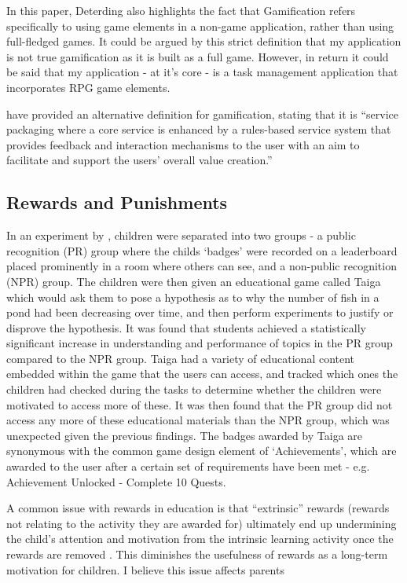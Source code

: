 In this paper, Deterding also highlights the fact that Gamification refers specifically to using game elements in a non-game application, rather than using full-fledged games.
It could be argued by this strict definition that my application is not true gamification as it is built as a full game.
However, in return it could be said that my application - at it's core - is a task management application that incorporates RPG game elements.

\cite{huotari2011gamification} have provided an alternative definition for gamification, stating that it is ``service packaging where a core service is enhanced by a rules-based service system that provides feedback and interaction mechanisms to the user with an aim to facilitate and support the users’ overall value creation.''

\subsection{Rewards and Punishments}
In an experiment by \cite{Filsecker2014136}, children were separated into two groups - a public recognition (PR) group where the childs `badges' were recorded on a leaderboard placed prominently in a room where others can see, and a non-public recognition (NPR) group.
The children were then given an educational game called Taiga which would ask them to pose a hypothesis as to why the number of fish in a pond had been decreasing over time, and then perform experiments to justify or disprove the hypothesis.
It was found that students achieved a statistically significant increase in understanding and performance of topics in the PR group compared to the NPR group.
Taiga had a variety of educational content embedded within the game that the users can access, and tracked which ones the children had checked during the tasks to determine whether the children were motivated to access more of these. 
It was then found that the PR group did not access any more of these educational materials than the NPR group, which was unexpected given the previous findings. 
The badges awarded by Taiga are synonymous with the common game design element of `Achievements', which are awarded to the user after a certain set of requirements have been met - e.g. Achievement Unlocked - Complete 10 Quests.

A common issue with rewards in education is that ``extrinsic'' rewards (rewards not relating to the activity they are awarded for) ultimately end up undermining the child's attention and motivation from the intrinsic learning activity once the rewards are removed \citep{deci2001extrinsic,ACP:ACP2350090502}.
This diminishes the usefulness of rewards as a long-term motivation for children.
I believe this issue affects parents


